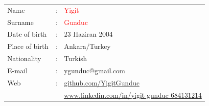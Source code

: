 \documentclass[a4paper]{article}
\begin{document}
\noindent
\begin{minipage}{0.4\textwidth}
 \centering
\label{fig:sample_figure}
\end{minipage}
\hskip 0.2cm
\begin{minipage}{0.6\textwidth}




\begin{tabular}{lcl}
Name           &:& \textcolor{red}{\Large Yigit} \\
Surname        &:& \textcolor{red}{\Large Gunduc} \\
Date of birth  &:& 23 Haziran 2004\\
Place of birth &:& Ankara/Turkey \\
Nationality    &:& Turkish  \\
E-mail         &:& \href{mailto:ygunduc@gmail.com}{ygunduc@gmail.com} \\
Web            &:& \href{https://github.com/YigitGunduc}{github.com/YigitGunduc}\\
               & & \url{www.linkedin.com/in/yigit-gunduc-684131214}
\end{tabular} 
\end{minipage}\\
\end{document}
